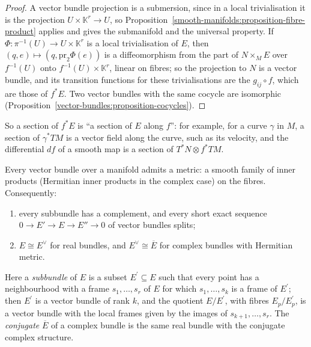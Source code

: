 \begin{proof}
A vector bundle projection is a submersion, since in a local trivialisation it is the projection $U \times \mathbb{K}^r \to U$, so
Proposition~\ref{smooth-manifolds:proposition-fibre-product} applies and gives the submanifold and the universal property. If $\Phi \colon \pi^{-1}(U) \to U \times \mathbb{K}^r$
is a local trivialisation of $E$, then $(q, e) \mapsto (q, \mathrm{pr}_2\Phi(e))$ is a diffeomorphism from the part of $N \times_ME$ over $f^{-1}(U)$ onto
$f^{-1}(U) \times \mathbb{K}^r$, linear on fibres; so the projection to $N$ is a vector bundle, and its transition functions for these trivialisations are the
$g_{ij} \circ f$, which are those of $f^*E$. Two vector bundles with the same cocycle are isomorphic (Proposition~\ref{vector-bundles:proposition-cocycles}).
\end{proof}

So a section of $f^*E$ is ``a section of $E$ along $f$'': for example, for a curve $\gamma$ in $M$, a section of $\gamma^*TM$ is a vector field along the curve, such as its
velocity, and the differential $df$ of a smooth map is a section of $T^*N \otimes f^*TM$.

\begin{proposition}\label{vector-bundles:proposition-metrics}
Every vector bundle over a manifold admits a metric: a smooth family of inner products (Hermitian inner products in the complex case) on the fibres. Consequently:
\begin{enumerate}
\item every subbundle has a complement, and every short exact sequence $0 \to E' \to E \to E'' \to 0$ of vector bundles splits;
\item $E \cong E^\vee$ for real bundles, and $E^\vee \cong \overline{E}$ for complex bundles with Hermitian metric.
\end{enumerate}
\end{proposition}

Here a \emph{subbundle} of $E$ is a subset $E^{\prime} \subseteq E$ such that every point has a neighbourhood with a frame $s_1, \ldots, s_r$ of $E$ for which $s_1, \ldots, s_k$ is a frame of
$E^{\prime}$; then $E^{\prime}$ is a vector bundle of rank $k$, and the quotient $E/E^{\prime}$, with fibres $E_p/E^{\prime}_p$, is a vector bundle with the local frames given by the images of
$s_{k+1}, \ldots, s_r$. The \emph{conjugate} $\overline{E}$ of a complex bundle is the same real bundle with the conjugate complex structure.


